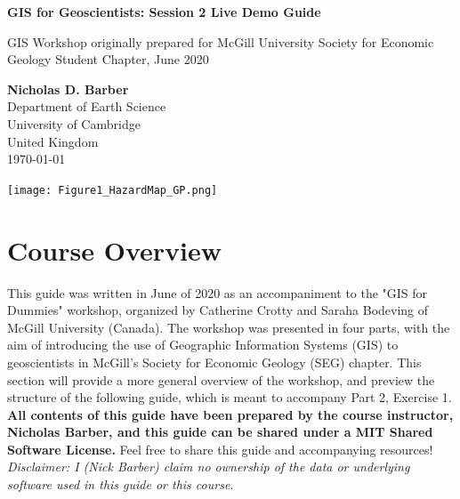 \documentclass{article}
\begin{document}
\begin{titlepage}
   \begin{center}
       \vspace*{1cm}

       \LARGE
       \textbf{GIS for Geoscientists: Session 2 Live Demo Guide}
       
       \Large
       \vspace{0.3cm}
        GIS Workshop originally prepared for McGill University Society for Economic Geology Student Chapter, June 2020
            
       \vspace{1.2cm}
       \textbf{Nicholas D. Barber}\\
       Department of Earth Science\\
       University of Cambridge\\
       United Kingdom\\
       \today
            
       \vspace{0.8cm}
     
       \texttt{[image: Figure1\_HazardMap\_GP.png]}
   \end{center}
\end{titlepage}

\tableofcontents

\section{Course Overview}

This guide was written in June of 2020 as an accompaniment to the "GIS for Dummies" workshop, organized by Catherine Crotty and Saraha Bodeving of McGill University (Canada). The workshop was presented in four parts, with the aim of introducing the use of Geographic Information Systems (GIS) to geoscientists in McGill's Society for Economic Geology (SEG) chapter. This section will provide a more general overview of the workshop, and preview the structure of the following guide, which is meant to accompany Part 2, Exercise 1. \textbf{All contents of this guide have been prepared by the course instructor, Nicholas Barber, and this guide can be shared under a MIT Shared Software License.} Feel free to share this guide and accompanying resources! \textit{Disclaimer: I (Nick Barber) claim no ownership of the data or underlying software used in this guide or this course.} 
\end{document}
